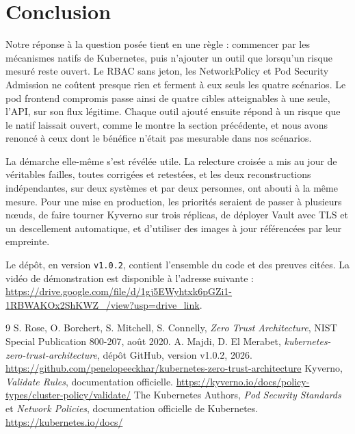 \documentclass[11pt,a4paper]{article}
\newcommand{\video}{\url{https://drive.google.com/file/d/1gj5EWyhtxk6pGZi1-1RBWAKOx2ShKWZ_/view?usp=drive_link}}
\newcommand{\code}[1]{\texttt{#1}}
\begin{document}
\section{Conclusion}

Notre réponse à la question posée tient en une règle : commencer par les mécanismes natifs de Kubernetes, puis n'ajouter un outil que lorsqu'un risque mesuré reste ouvert. Le RBAC sans jeton, les NetworkPolicy et Pod Security Admission ne coûtent presque rien et ferment à eux seuls les quatre scénarios. Le pod frontend compromis passe ainsi de quatre cibles atteignables à une seule, l'API, sur son flux légitime. Chaque outil ajouté ensuite répond à un risque que le natif laissait ouvert, comme le montre la section précédente, et nous avons renoncé à ceux dont le bénéfice n'était pas mesurable dans nos scénarios.

La démarche elle-même s'est révélée utile. La relecture croisée a mis au jour de véritables failles, toutes corrigées et retestées, et les deux reconstructions indépendantes, sur deux systèmes et par deux personnes, ont abouti à la même mesure. Pour une mise en production, les priorités seraient de passer à plusieurs nœuds, de faire tourner Kyverno sur trois réplicas, de déployer Vault avec TLS et un descellement automatique, et d'utiliser des images à jour référencées par leur empreinte.

Le dépôt, en version \code{v1.0.2}, contient l'ensemble du code et des preuves citées. La vidéo de démonstration est disponible à l'adresse suivante : \video.

\begin{thebibliography}{9}
 S. Rose, O. Borchert, S. Mitchell, S. Connelly, \textit{Zero Trust Architecture}, NIST Special Publication 800-207, août 2020.
 A. Majdi, D. El Merabet, \textit{kubernetes-zero-trust-architecture}, dépôt GitHub, version v1.0.2, 2026. \url{https://github.com/penelopeeckhar/kubernetes-zero-trust-architecture}
 Kyverno, \textit{Validate Rules}, documentation officielle. \url{https://kyverno.io/docs/policy-types/cluster-policy/validate/}
 The Kubernetes Authors, \textit{Pod Security Standards} et \textit{Network Policies}, documentation officielle de Kubernetes. \url{https://kubernetes.io/docs/}
\end{thebibliography}
\end{document}
